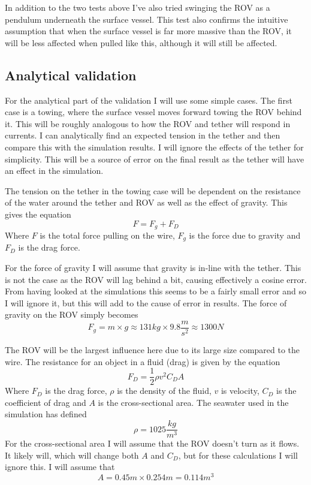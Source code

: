 In addition to the two tests above I've also tried swinging the ROV as a pendulum underneath the surface vessel. This test also confirms the intuitive assumption that when the surface vessel is far more massive than the ROV, it will be less affected when pulled like this, although it will still be affected. 

\subsection{Analytical validation}
For the analytical part of the validation I will use some simple cases. The first case is a towing, where the surface vessel moves forward towing the ROV behind it. This will be roughly analogous to how the ROV and tether will respond in currents. I can analytically find an expected tension in the tether and then compare this with the simulation results. I will ignore the effects of the tether for simplicity. This will be a source of error on the final result as the tether will have an effect in the simulation.

The tension on the tether in the towing case will be dependent on the resistance of the water around the tether and ROV as well as the effect of gravity. This gives the equation 
\[F = F_g + F_D\]
Where \(F\) is the total force pulling on the wire, \(F_g\) is the force due to gravity and \(F_D\) is the drag force. 

For the force of gravity I will assume that gravity is in-line with the tether. This is not the case as the ROV will lag behind a bit, causing effectively a cosine error. From having looked at the simulations this seems to be a fairly small error and so I will ignore it, but this will add to the cause of error in results. The force of gravity on the ROV simply becomes 
\[F_g = m \times g \approx 131kg \times 9.8\frac{m}{s^2} \approx 1300N\] 

The ROV will be the largest influence here due to its large size compared to the wire. The resistance for an object in a fluid (drag) is given by the equation 
\[F_D = \frac 1 2 \rho v^2 C_D A\]
Where \(F_D\) is the drag force, \(\rho\) is the density of the fluid, \(v\) is velocity, \(C_D\) is the coefficient of drag and \(A\) is the cross-sectional area. The seawater used in the simulation has defined \[\rho = 1025\frac{kg}{m^3}\] For the cross-sectional area I will assume that the ROV doesn't turn as it flows. It likely will, which will change both \(A\) and \(C_D\), but for these calculations I will ignore this. I will assume that \[A = 0.45m\times 0.254m = 0.114m^3\]


